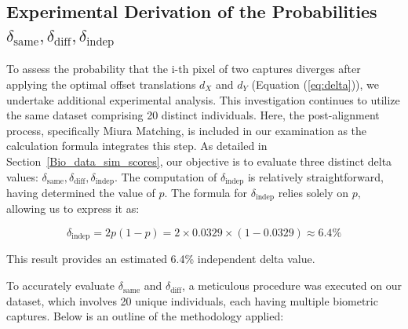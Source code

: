 \newpage
\subsection{Experimental Derivation of the Probabilities \(\delta_{\text{same}}, \delta_{\text{diff}}, \delta_{\text{indep}}\)}
\label{sec:delta}

To assess the probability that the i-th pixel of two captures diverges after applying the optimal offset translations \( d_X \) and \( d_Y \) (Equation (\ref{eq:delta})), we undertake additional experimental analysis. This investigation continues to utilize the same dataset comprising 20 distinct individuals. Here, the post-alignment process, specifically Miura Matching, is included in our examination as the calculation formula integrates this step. As detailed in Section~\ref{Bio_data_sim_scores}, our objective is to evaluate three distinct delta values: \(\delta_{\text{same}}, \delta_{\text{diff}}, \delta_{\text{indep}}\). The computation of \( \delta_{\text{indep}} \) is relatively straightforward, having determined the value of \( p \). The formula for \( \delta_{\text{indep}} \) relies solely on \( p \), allowing us to express it as:

\[ \delta_{\text{indep}} = 2p(1 - p) = 2 \times 0.0329 \times (1 - 0.0329) \approx 6.4\% \]

This result provides an estimated 6.4\% independent delta value.

To accurately evaluate \( \delta_{\text{same}} \) and \( \delta_{\text{diff}} \), a meticulous procedure was executed on our dataset, which involves 20 unique individuals, each having multiple biometric captures. Below is an outline of the methodology applied:

